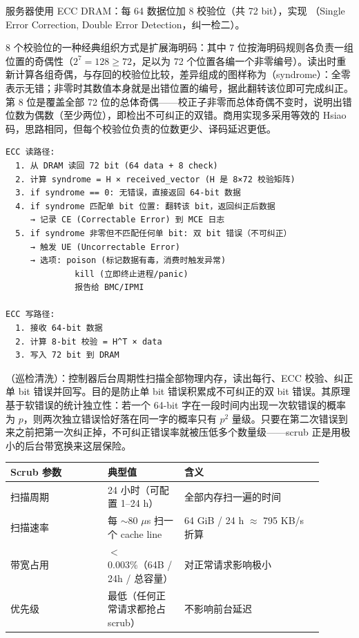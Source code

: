 

服务器使用 ECC DRAM：每 64 数据位加 8 校验位（共 72 bit），实现 （Single Error Correction, Double Error Detection，纠一检二）。

8 个校验位的一种经典组织方式是扩展海明码：其中 7 位按海明码规则各负责一组位置的奇偶性（$2^7 = 128 \ge 72$，足以为 72 个位置各编一个非零编号）。读出时重新计算各组奇偶，与存回的校验位比较，差异组成的图样称为（syndrome）：全零表示无错；非零时其数值本身就是出错位置的编号，据此翻转该位即可完成纠正。第 8 位是覆盖全部 72 位的总体奇偶——校正子非零而总体奇偶不变时，说明出错位数为偶数（至少两位），即检出不可纠正的双错。商用实现多采用等效的 Hsiao 码，思路相同，但每个校验位负责的位数更少、译码延迟更低。

\begin{lstlisting}
ECC 读路径:
  1. 从 DRAM 读回 72 bit (64 data + 8 check)
  2. 计算 syndrome = H × received_vector (H 是 8×72 校验矩阵)
  3. if syndrome == 0: 无错误，直接返回 64-bit 数据
  4. if syndrome 匹配单 bit 位置: 翻转该 bit，返回纠正后数据
     → 记录 CE (Correctable Error) 到 MCE 日志
  5. if syndrome 非零但不匹配任何单 bit: 双 bit 错误（不可纠正）
     → 触发 UE (Uncorrectable Error)
     → 选项: poison (标记数据有毒，消费时触发异常)
              kill (立即终止进程/panic)
              报告给 BMC/IPMI

ECC 写路径:
  1. 接收 64-bit 数据
  2. 计算 8-bit 校验 = H^T × data
  3. 写入 72 bit 到 DRAM
\end{lstlisting}

（巡检清洗）：控制器后台周期性扫描全部物理内存，读出每行、ECC 校验、纠正单 bit 错误并回写。目的是防止单 bit 错误积累成不可纠正的双 bit 错误。其原理基于软错误的统计独立性：若一个 64-bit 字在一段时间内出现一次软错误的概率为 $p$，则两次独立错误恰好落在同一字的概率只有 $p^2$ 量级。只要在第二次错误到来之前把第一次纠正掉，不可纠正错误率就被压低多个数量级——scrub 正是用极小的后台带宽换来这层保险。

\begin{longtable}{L{0.28\linewidth}L{0.22\linewidth}L{0.4\linewidth}}
\toprule
Scrub 参数 & 典型值 & 含义 \\
\midrule
扫描周期 & 24 小时（可配置 1--24 h） & 全部内存扫一遍的时间 \\
扫描速率 & 每 $\sim$80 $\mu$s 扫一个 cache line & 64 GiB / 24 h $\approx$ 795 KB/s 折算 \\
带宽占用 & $<$0.003\%（64B / 24h / 总容量） & 对正常请求影响极小 \\
优先级 & 最低（任何正常请求都抢占 scrub） & 不影响前台延迟 \\
\bottomrule
\end{longtable}


